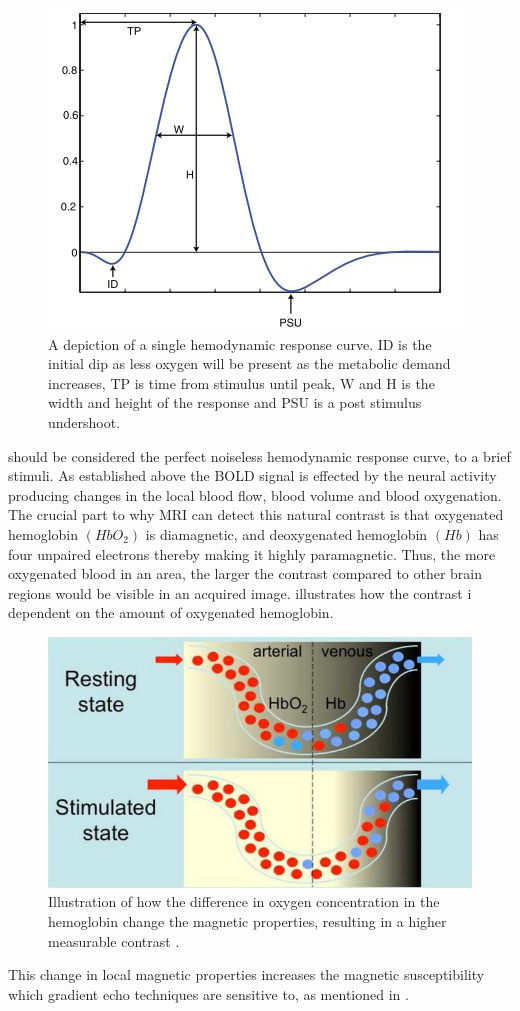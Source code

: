 \begin{figure}[H]                 
	\includegraphics[width=.48\textwidth]{figures/aBackground/HRF}  
	\caption{A depiction of a single hemodynamic response curve. ID is the initial dip as less oxygen will be present as the metabolic demand increases, TP is time from stimulus until peak, W and H is the width and height of the response and PSU is a post stimulus undershoot. \cite{Poldrack2011}}
	\label{fig:back:HRF} 
\end{figure}

 should be considered the perfect noiseless hemodynamic response curve, to a brief stimuli. 
As established above the BOLD signal is effected by the neural activity producing changes in the local blood flow, blood volume and blood oxygenation. The crucial part to why MRI can detect this natural contrast is that oxygenated hemoglobin $(HbO_2)$ is diamagnetic, and deoxygenated hemoglobin $(Hb)$ has four unpaired electrons thereby making it highly paramagnetic. Thus, the more oxygenated blood in an area, the larger the contrast compared to other brain regions would be visible in an acquired image. \cite{Glover2011,Poldrack2011,Khanna2015}  illustrates how the contrast i dependent on the amount of oxygenated hemoglobin. \cite{Glover2011}

\begin{figure}[H]                 
	\includegraphics[width=.47\textwidth]{figures/aBackground/bold_response}  
	\caption{Illustration of how the difference in oxygen concentration in the hemoglobin change the magnetic properties, resulting in a higher measurable contrast \cite{Glover2011}.}
	\label{fig:back:bold} 
\end{figure}

This change in local magnetic properties increases the magnetic susceptibility which gradient echo techniques are sensitive to, as mentioned in  \cite{Lee2002}.  
